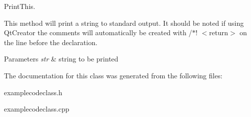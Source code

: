 Print\-This. 

This method will print a string to standard output. It should be noted if using Qt\-Creator the comments will automatically be created with /$\ast$! $<$return$>$ on the line before the declaration.


\begin{DoxyParams}{Parameters}
{\em str} & string to be printed \\
\hline
\end{DoxyParams}


The documentation for this class was generated from the following files\-:\begin{DoxyCompactItemize}
\item 
examplecodeclass.\-h\item 
examplecodeclass.\-cpp\end{DoxyCompactItemize}
